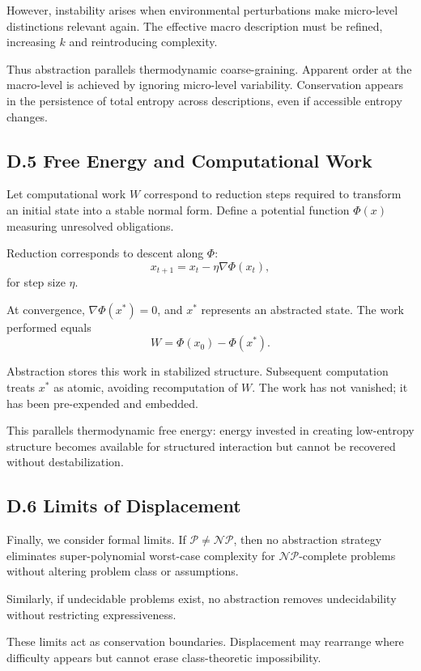 \documentclass[11pt]{article}
\begin{document}
However, instability arises when environmental perturbations make micro-level distinctions relevant again. The effective macro description must be refined, increasing $k$ and reintroducing complexity.

Thus abstraction parallels thermodynamic coarse-graining. Apparent order at the macro-level is achieved by ignoring micro-level variability. Conservation appears in the persistence of total entropy across descriptions, even if accessible entropy changes.

\subsection{D.5 Free Energy and Computational Work}

Let computational work $W$ correspond to reduction steps required to transform an initial state into a stable normal form. Define a potential function $\Phi(x)$ measuring unresolved obligations.

Reduction corresponds to descent along $\Phi$:
\[
x_{t+1} = x_t - \eta \nabla \Phi(x_t),
\]
for step size $\eta$.

At convergence, $\nabla \Phi(x^*) = 0$, and $x^*$ represents an abstracted state. The work performed equals
\[
W = \Phi(x_0) - \Phi(x^*).
\]

Abstraction stores this work in stabilized structure. Subsequent computation treats $x^*$ as atomic, avoiding recomputation of $W$. The work has not vanished; it has been pre-expended and embedded.

This parallels thermodynamic free energy: energy invested in creating low-entropy structure becomes available for structured interaction but cannot be recovered without destabilization.

\subsection{D.6 Limits of Displacement}

Finally, we consider formal limits. If $\mathcal{P} \neq \mathcal{NP}$, then no abstraction strategy eliminates super-polynomial worst-case complexity for $\mathcal{NP}$-complete problems without altering problem class or assumptions.

Similarly, if undecidable problems exist, no abstraction removes undecidability without restricting expressiveness.

These limits act as conservation boundaries. Displacement may rearrange where difficulty appears but cannot erase class-theoretic impossibility.
\end{document}
